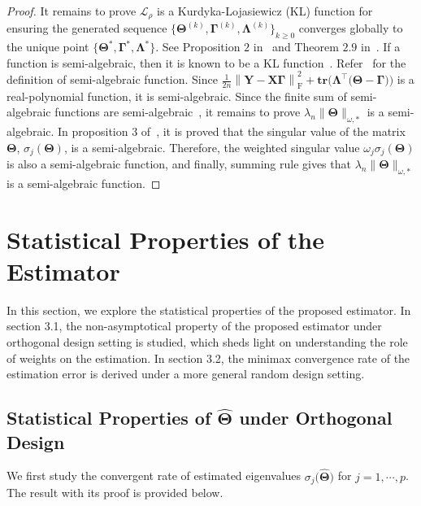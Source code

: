 \documentclass[alpha-refs]{wiley-article}
\begin{document}
\begin{proof}
It remains to prove $\mathcal{L}_{\rho}$ is a Kurdyka-Lojasiewicz (KL) function for ensuring the generated sequence
$\{\boldsymbol{\Theta}^{(k)},\boldsymbol{\Gamma}^{(k)},\boldsymbol{\Lambda}^{(k)}\}_{k \geq 0}$ converges globally to the unique point 
$\{\boldsymbol{\Theta}^{*},\boldsymbol{\Gamma}^{*},\boldsymbol{\Lambda}^{*}\}$.
See Proposition $2$ in~\citet{wang2019global} and Theorem $2.9$ in~\citet{attouch2013convergence}.
If a function is semi-algebraic, then it is known to be a KL function~\citep{attouch2013convergence,sun2017global}.
Refer~\citet{sun2017global} for the definition of semi-algebraic function.
Since $\frac{1}{2n}\left\| \boldsymbol{Y}-\boldsymbol{X\Gamma} \right\|_{\text{F}}^{2}+\textbf{tr}\big( \boldsymbol{\Lambda}^{\top}\big( \boldsymbol{\Theta}-\boldsymbol{\Gamma} \big)\big)$ is a real-polynomial function, it is semi-algebraic.
Since the finite sum of semi-algebraic functions are semi-algebraic~\citep{attouch2013convergence}, it remains to prove $\lambda_{n}\|\boldsymbol{\Theta}\|_{\omega,*}$ is a semi-algebraic. 
In proposition $3$ of~\citet{sun2017global}, it is proved that the singular value of the matrix $\boldsymbol{\Theta}$, $\sigma_{j}(\boldsymbol{\Theta})$, is a semi-algebraic.
Therefore, the weighted singular value $\omega_{j}\sigma_{j}(\boldsymbol{\Theta})$ is also a semi-algebraic function, and finally, summing rule gives that $\lambda_{n}\|\boldsymbol{\Theta}\|_{\omega,*}$ is a semi-algebraic function.
\end{proof}

\section{Statistical Properties of the Estimator}
In this section, we explore the statistical properties of the proposed estimator. 
In section 3.1, the non-asymptotical property of the proposed estimator under orthogonal design setting is studied, which sheds light on understanding the role of weights on the estimation. In section 3.2, the minimax convergence rate of the estimation error is derived under a more general random design setting.

\subsection{Statistical Properties of $\widehat{\boldsymbol{\Theta}}$ under Orthogonal Design}
We first study the convergent rate of estimated eigenvalues $\sigma_{j}\big(\widehat{\boldsymbol{\Theta}}\big)$ for $j = 1, \cdots, p$. 
The result with its proof is provided below.
\end{document}
